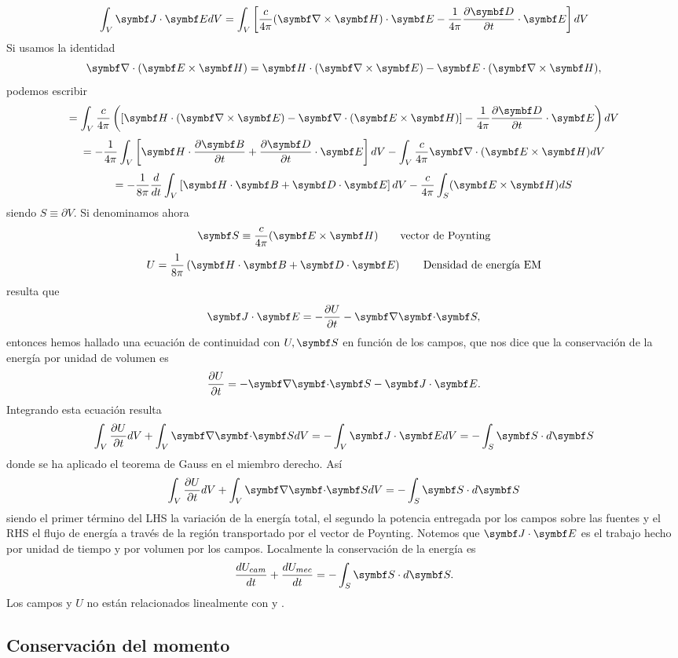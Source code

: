 \documentclass[10pt,oneside]{CBFT_book}
\begin{document}
\[
	\int_V \vb{J}\cdot \vb{E} dV = \int_V \left[ \frac{c}{4\pi}(\rotorm{H})\cdot\vb{E} - 
		\frac{1}{4\pi}\dpar{\vb{D}}{t}\cdot\vb{E} \right] dV
\]
Si usamos la identidad
\[
	\Nabla\cdot(\pv{E}{H}) = \vb{H}\cdot(\rotorm{E}) - \vb{E}\cdot(\rotorm{H}),
\]
podemos escribir
\[
	= \int_V \frac{c}{4\pi} \left( \left[ \vb{H}\cdot(\rotorm{E}) - \Nabla\cdot(\pv{E}{H}) \right] - 
		\frac{1}{4\pi}\dpar{\vb{D}}{t}\cdot\vb{E}  \right) dV
\]
\[
	= - \frac{1}{4\pi}\int_V \left[ \vb{H}\cdot\dpar{\vb{B}}{t} + \dpar{\vb{D}}{t}\cdot\vb{E} \right] dV - 
		\int_V \frac{c}{4\pi}  \Nabla\cdot(\pv{E}{H}) dV
\]
\[
	= - \frac{1}{8\pi}\frac{d}{dt} \int_V \left[ \vb{H}\cdot\vb{B} + \vb{D}\cdot\vb{E} \right] dV - 
		 \frac{c}{4\pi} \int_S (\pv{E}{H}) dS
\]
siendo $S\equiv\partial V$. Si denominamos ahora
\[
	\vb{S} \equiv \frac{c}{4\pi}(\pv{E}{H}) \qquad \text{vector de Poynting}
\]
\[
	U = \frac{1}{8\pi}\left( \vb{H}\cdot\vb{B} + \vb{D}\cdot\vb{E} \right) \qquad \text{Densidad de energía EM}
\]
resulta que 
\[
	\pe{J}{E} = -\dpar{U}{t} - \divem{S},
\]
entonces hemos hallado una ecuación de continuidad con $U, \vb{S}$ en función de los campos, que nos
dice que la conservación de la energía por unidad de volumen es
\[
	\dpar{U}{t} = -\divem{S} -\pe{J}{E}.
\]
Integrando esta ecuación resulta
\[
	\int_V \dpar{U}{t} dV + \int_V \divem{S} dV = - \int_V \pe{J}{E} dV = -\int_S \vb{S}\cdot d\vb{S}
\]
donde se ha aplicado el teorema de Gauss en el miembro derecho.
Así
\[
	\int_V \dpar{U}{t} dV + \int_V \divem{S} dV = -\int_S \vb{S}\cdot d\vb{S}
\]
siendo el primer término del LHS la variación de la energía total, el segundo la potencia entregada por
los campos sobre las fuentes y el RHS el flujo de energía a través de la región transportado por el
vector de Poynting.
Notemos que $\pe{J}{E}$ es el trabajo hecho por unidad de tiempo y por volumen por los campos.
Localmente la conservación de la energía es
\[
	\dtot{U_{cam}}{t} + \dtot{U_{mec}}{t} = -\int_S \vb{S}\cdot d\vb{S}.
\]
Los campos  y $U$ no están relacionados linealmente con  y .

\subsection{Conservación del momento}
\end{document}
